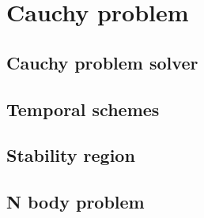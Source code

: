 
 \chapter{Cauchy problem}
 
 \section{Cauchy problem solver}
 
 
 \section{Temporal schemes} 
 
 
 \section{Stability region} 
 
 
 \section{N body problem} 
